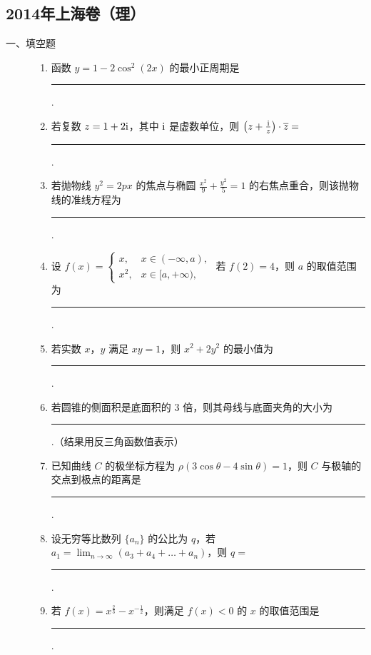\subsection{2014年上海卷（理）}\label{gk:2014年上海卷（理）}

\begin{description}

    \item[一、填空题]

    \begin{enumerate}[leftmargin=5pt]

        \item 函数 \( y = 1 - 2\cos^2(2x) \) 的最小正周期是\rule[-0.3ex]{3em}{0.4pt}.

        \item 若复数 \(z = 1 + 2\mathrm{i}\)，其中 \(\mathrm{i}\) 是虚数单位，则 \(\left(z + \frac{\mathrm{i}}{z}\right) \cdot \overline{z} =\)\rule[-0.3ex]{3em}{0.4pt}.

        \item 若抛物线 \( y^{2}=2px \) 的焦点与椭圆 \( \frac{x^{2}}{9}+\frac{y^{2}}{5}=1 \) 的右焦点重合，则该抛物线的准线方程为\rule[-0.3ex]{3em}{0.4pt}.

        \item 设 \( f(x) = \begin{cases}
x, & x \in (-\infty, a),\\
x^2, & x \in [a, +\infty),
\end{cases} \) 若 \( f(2) = 4 \)，则 \( a \) 的取值范围为\rule[-0.3ex]{3em}{0.4pt}.

        \item 若实数 \(x\)，\(y\) 满足 \(xy = 1\)，则 \(x^2 + 2y^2\) 的最小值为\rule[-0.3ex]{3em}{0.4pt}.

        \item 若圆锥的侧面积是底面积的 \(3\text{ 倍}\)，则其母线与底面夹角的大小为\rule[-0.3ex]{3em}{0.4pt}.（结果用反三角函数值表示）

        \item 已知曲线 \(C\) 的极坐标方程为 \( \rho(3\cos\theta-4\sin\theta)=1 \)，则 \(C\) 与极轴的交点到极点的距离是\rule[-0.3ex]{3em}{0.4pt}.

        \item 设无穷等比数列 \(\{a_{n}\}\) 的公比为 \(q\)，若 \(a_{1} = \displaystyle\lim_{n\to \infty}(a_{3} + a_{4} + \dots + a_{n})\)，则 \(q =\)\rule[-0.3ex]{3em}{0.4pt}.

        \item 若 \( f(x) = x^{\frac{2}{3}} - x^{-\frac{1}{2}} \)，则满足 \( f(x) < 0 \) 的 \( x \) 的取值范围是\rule[-0.3ex]{3em}{0.4pt}.


\end{enumerate}
\end{description}

